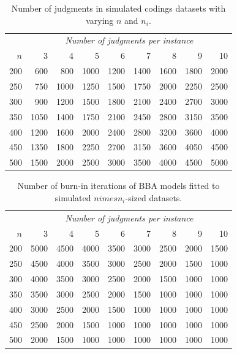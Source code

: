 \documentclass[12pt,]{article}
\begin{document}
\begin{table}[!h]

\caption{\label{tab:sim_data_judgment_sizes}Number of judgments in simulated codings datasets with varying $n$ and $n_i$.}
\centering
\begin{tabular}{rrrrrrrrr}
\toprule
\multicolumn{1}{c}{\em  } & \multicolumn{8}{c}{\em Number of judgments per instance} \\
\cmidrule(l{2pt}r{2pt}){2-9}
$n$ & 3 & 4 & 5 & 6 & 7 & 8 & 9 & 10\\
\midrule
200 & 600 & 800 & 1000 & 1200 & 1400 & 1600 & 1800 & 2000\\
250 & 750 & 1000 & 1250 & 1500 & 1750 & 2000 & 2250 & 2500\\
300 & 900 & 1200 & 1500 & 1800 & 2100 & 2400 & 2700 & 3000\\
350 & 1050 & 1400 & 1750 & 2100 & 2450 & 2800 & 3150 & 3500\\
400 & 1200 & 1600 & 2000 & 2400 & 2800 & 3200 & 3600 & 4000\\
450 & 1350 & 1800 & 2250 & 2700 & 3150 & 3600 & 4050 & 4500\\
500 & 1500 & 2000 & 2500 & 3000 & 3500 & 4000 & 4500 & 5000\\
\bottomrule
\end{tabular}
\end{table}

\begin{table}[!h]

\caption{\label{tab:unnamed-chunk-1}Number of burn-in iterations of BBA models fitted to simulated $n   imes n_i$-sized datasets.}
\centering
\begin{tabular}{rrrrrrrrr}
\toprule
\multicolumn{1}{c}{\em  } & \multicolumn{8}{c}{\em Number of judgments per instance} \\
\cmidrule(l{2pt}r{2pt}){2-9}
$n$ & 3 & 4 & 5 & 6 & 7 & 8 & 9 & 10\\
\midrule
200 & 5000 & 4500 & 4000 & 3500 & 3000 & 2500 & 2000 & 1500\\
250 & 4500 & 4000 & 3500 & 3000 & 2500 & 2000 & 1500 & 1000\\
300 & 4000 & 3500 & 3000 & 2500 & 2000 & 1500 & 1000 & 1000\\
350 & 3500 & 3000 & 2500 & 2000 & 1500 & 1000 & 1000 & 1000\\
400 & 3000 & 2500 & 2000 & 1500 & 1000 & 1000 & 1000 & 1000\\
450 & 2500 & 2000 & 1500 & 1000 & 1000 & 1000 & 1000 & 1000\\
500 & 2000 & 1500 & 1000 & 1000 & 1000 & 1000 & 1000 & 1000\\
\bottomrule
\end{tabular}
\end{table}
\end{document}
